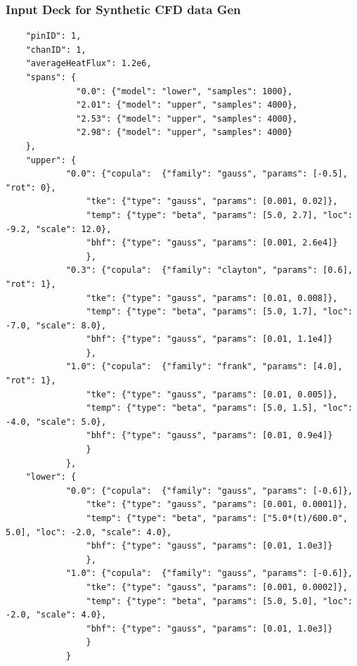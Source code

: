 \documentclass[t, pdftex]{beamer}
\begin{document}
\begin{frame}[fragile,shrink=30]
\frametitle{Input Deck for Synthetic CFD data Gen}
\begin{verbatim}
    "pinID": 1,
    "chanID": 1,
    "averageHeatFlux": 1.2e6,
    "spans": {
              "0.0": {"model": "lower", "samples": 1000},
              "2.01": {"model": "upper", "samples": 4000},
              "2.53": {"model": "upper", "samples": 4000},
              "2.98": {"model": "upper", "samples": 4000}
    },
    "upper": {
            "0.0": {"copula":  {"family": "gauss", "params": [-0.5], "rot": 0},
                "tke": {"type": "gauss", "params": [0.001, 0.02]},
                "temp": {"type": "beta", "params": [5.0, 2.7], "loc": -9.2, "scale": 12.0},
                "bhf": {"type": "gauss", "params": [0.001, 2.6e4]}
                },
            "0.3": {"copula":  {"family": "clayton", "params": [0.6], "rot": 1},
                "tke": {"type": "gauss", "params": [0.01, 0.008]},
                "temp": {"type": "beta", "params": [5.0, 1.7], "loc": -7.0, "scale": 8.0},
                "bhf": {"type": "gauss", "params": [0.01, 1.1e4]}
                },
            "1.0": {"copula":  {"family": "frank", "params": [4.0], "rot": 1},
                "tke": {"type": "gauss", "params": [0.01, 0.005]},
                "temp": {"type": "beta", "params": [5.0, 1.5], "loc": -4.0, "scale": 5.0},
                "bhf": {"type": "gauss", "params": [0.01, 0.9e4]}
                }
            },
    "lower": {
            "0.0": {"copula":  {"family": "gauss", "params": [-0.6]},
                "tke": {"type": "gauss", "params": [0.001, 0.0001]},
                "temp": {"type": "beta", "params": ["5.0*(t)/600.0", 5.0], "loc": -2.0, "scale": 4.0},
                "bhf": {"type": "gauss", "params": [0.01, 1.0e3]}
                },
            "1.0": {"copula":  {"family": "gauss", "params": [-0.6]},
                "tke": {"type": "gauss", "params": [0.001, 0.0002]},
                "temp": {"type": "beta", "params": [5.0, 5.0], "loc": -2.0, "scale": 4.0},
                "bhf": {"type": "gauss", "params": [0.01, 1.0e3]}
                }
            }
\end{verbatim}
\end{frame}
\end{document}

